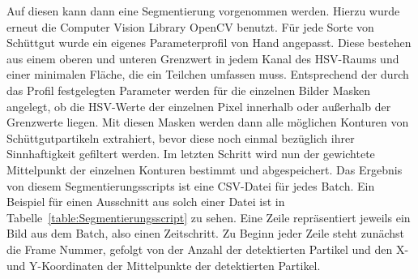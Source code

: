 Auf diesen kann dann eine Segmentierung vorgenommen werden.
Hierzu wurde erneut die Computer Vision Library OpenCV benutzt.
Für jede Sorte von Schüttgut wurde ein eigenes Parameterprofil von Hand angepasst.
Diese bestehen aus einem oberen und unteren Grenzwert in jedem Kanal des HSV-Raums und einer minimalen Fläche, die ein Teilchen umfassen muss.
Entsprechend der durch das Profil festgelegten Parameter werden für die einzelnen Bilder Masken angelegt,
ob die HSV-Werte der einzelnen Pixel innerhalb oder außerhalb der Grenzwerte liegen. 
Mit diesen Masken werden dann alle möglichen Konturen von Schüttgutpartikeln extrahiert, 
bevor diese noch einmal bezüglich ihrer Sinnhaftigkeit gefiltert werden. 
Im letzten Schritt wird nun der gewichtete Mittelpunkt der einzelnen Konturen bestimmt und abgespeichert.
Das Ergebnis von diesem Segmentierungsscripts ist eine CSV-Datei für jedes Batch.
Ein Beispiel für einen Ausschnitt aus solch einer Datei ist in Tabelle~\ref{table:Segmentierungsscript} zu sehen.
Eine Zeile repräsentiert jeweils ein Bild aus dem Batch, also einen Zeitschritt.
Zu Beginn jeder Zeile steht zunächst die Frame Nummer, gefolgt von der Anzahl der detektierten Partikel
und den X- und Y-Koordinaten der Mittelpunkte der detektierten Partikel.

